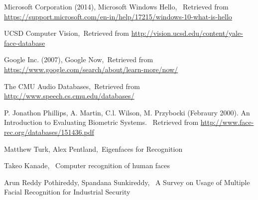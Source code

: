 \cleardoublepage
{}
{}
\begin{thebibliography}{99}

 Microsoft Corporation (2014), Microsoft Windows Hello, \ Retrieved from  \url{https://support.microsoft.com/en-in/help/17215/windows-10-what-is-hello}

UCSD Computer Vision,\ Retrieved from  \url{http://vision.ucsd.edu/content/yale-face-database}

 Google Inc. (2007), Google Now,\ Retrieved from  \url{https://www.google.com/search/about/learn-more/now/}

The CMU Audio Databases,\ Retrieved from  \url{http://www.speech.cs.cmu.edu/databases/}

 P. Jonathon Phillips, A. Martin, C.l. Wilson, M. Przybocki (Febraury 2000).  An Introduction to Evaluating Biometric Systems. \ Retrieved from \url{http://www.face-rec.org/databases/151436.pdf}

 Matthew Turk, Alex Pentland,\ {Eigenfaces for Recognition}

 Takeo Kanade, \ {Computer recognition of human faces}

 Arun Reddy Pothireddy, Spandana Sunkireddy, \ {A Survey on Usage of Multiple Facial Recognition for Industrial Security}

\end{thebibliography}
